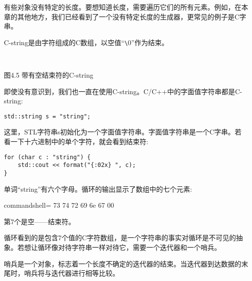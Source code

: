 
有些对象没有特定的长度。要想知道长度，需要遍历它们的所有元素。例如，在本章的其他地方，我们已经看到了一个没有特定长度的生成器，更常见的例子是C字串。

C-string是由字符组成的C数组，以空值“\verb|\|0”作为结束。

\hspace*{\fill} \\ %
\begin{center}

图4.5 带有空结束符的C-string
\end{center}

即使没有意识到，我们也一直在使用C-string。C/C++中的字面值字符串都是C-string:

\begin{lstlisting}[style=styleCXX]
std::string s = "string";
\end{lstlisting}

这里，STL字符串s初始化为一个字面值字符串。字面值字符串是一个C字串。若看一下十六进制中的单个字符，就会看到结束符:

\begin{lstlisting}[style=styleCXX]
for (char c : "string") {
	std::cout << format("{:02x} ", c);
}
\end{lstlisting}

单词“string”有六个字母。循环的输出显示了数组中的七个元素:

\begin{tcblisting}{commandshell={}}
73 74 72 69 6e 67 00
\end{tcblisting}

第7个是空——结束符。

循环看到的是包含7个值的C字符数组，是一个字符串的事实对循环是不可见的抽象。若想让循环像对待字符串一样对待它，需要一个迭代器和一个哨兵。

哨兵是一个对象，标志着一个长度不确定的迭代器的结束。当迭代器到达数据的末尾时，哨兵将与迭代器进行相等比较。

